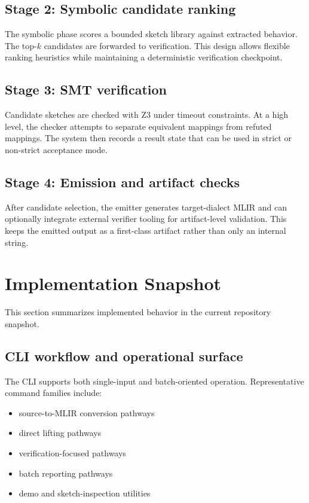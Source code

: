 \documentclass[conference]{IEEEtran}
\begin{document}
\subsection{Stage 2: Symbolic candidate ranking}
The symbolic phase scores a bounded sketch library against extracted behavior. The top-$k$ candidates are forwarded to verification. This design allows flexible ranking heuristics while maintaining a deterministic verification checkpoint.

\subsection{Stage 3: SMT verification}
Candidate sketches are checked with Z3 under timeout constraints. At a high level, the checker attempts to separate equivalent mappings from refuted mappings. The system then records a result state that can be used in strict or non-strict acceptance mode.

\subsection{Stage 4: Emission and artifact checks}
After candidate selection, the emitter generates target-dialect MLIR and can optionally integrate external verifier tooling for artifact-level validation. This keeps the emitted output as a first-class artifact rather than only an internal string.

\section{Implementation Snapshot}
This section summarizes implemented behavior in the current repository snapshot.

\subsection{CLI workflow and operational surface}
The CLI supports both single-input and batch-oriented operation. Representative command families include:
\begin{itemize}
\item source-to-MLIR conversion pathways
\item direct lifting pathways
\item verification-focused pathways
\item batch reporting pathways
\item demo and sketch-inspection utilities
\end{itemize}
\end{document}
